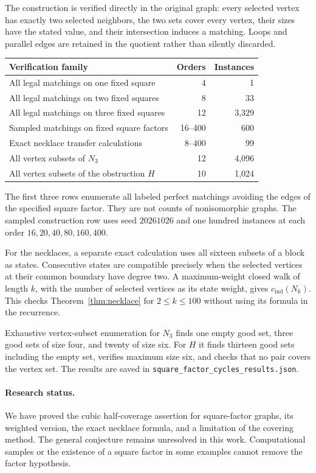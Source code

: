\documentclass[11pt]{article}
\newcommand{\cind}{c_{\mathrm{ind}}}
\begin{document}
The construction is verified directly in the original graph:
every selected vertex has exactly two selected neighbors, the two
sets cover every vertex, their sizes have the stated value, and their
intersection induces a matching. Loops and parallel edges are retained
in the quotient rather than silently discarded.

\begin{center}
\begin{tabular}{lrr}
\toprule
Verification family & Orders & Instances\\
\midrule
All legal matchings on one fixed square & 4 & 1\\
All legal matchings on two fixed squares & 8 & 33\\
All legal matchings on three fixed squares & 12 & 3,329\\
Sampled matchings on fixed square factors & 16--400 & 600\\
Exact necklace transfer calculations & 8--400 & 99\\
All vertex subsets of $N_3$ & 12 & 4,096\\
All vertex subsets of the obstruction $H$ & 10 & 1,024\\
\bottomrule
\end{tabular}
\end{center}

The first three rows enumerate all labeled perfect matchings avoiding
the edges of the specified square factor. They are not counts of
nonisomorphic graphs. The sampled construction row uses seed
$20261026$ and one hundred instances at each order
$16,20,40,80,160,400$.

For the necklaces, a separate exact calculation uses all sixteen
subsets of a block as states. Consecutive states are compatible
precisely when the selected vertices at their common boundary have
degree two. A maximum-weight closed walk of length $k$, with the number
of selected vertices as its state weight, gives $\cind(N_k)$.
This checks Theorem~\ref{thm:necklace} for $2\leq k\leq100$ without
using its formula in the recurrence.

Exhaustive vertex-subset enumeration for $N_3$ finds one empty good
set, three good sets of size four, and twenty of size six.
For $H$ it finds thirteen good sets including the empty set, verifies
maximum size six, and checks that no pair covers the vertex set.
The results are saved in
\texttt{square\_factor\_cycles\_results.json}.

\paragraph{Research status.}
We have proved the cubic half-coverage assertion for square-factor
graphs, its weighted version, the exact necklace formula, and a
limitation of the covering method. The general conjecture remains
unresolved in this work. Computational samples or the existence of a
square factor in some examples cannot remove the factor hypothesis.
\end{document}

